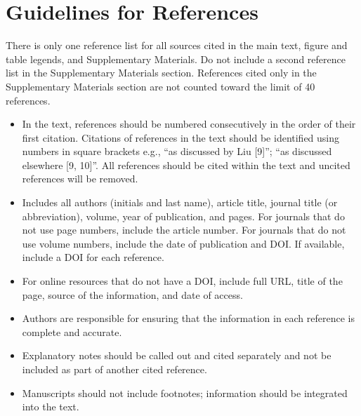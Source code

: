 \documentclass{article}
\begin{document}
\section*{Guidelines for References}
There is only one reference list for all sources cited in the main text, figure and table legends, and Supplementary Materials. Do not include a second reference list in the Supplementary Materials section. References cited only in the Supplementary Materials section are not counted toward the limit of 40 references.
\begin{itemize}
    \item In the text, references should be numbered consecutively in the order of their first citation. Citations of references in the text should be identified using numbers in square brackets e.g., “as discussed by Liu [9]”; “as discussed elsewhere [9, 10]”. All references should be cited within the text and uncited references will be removed.
    \item Includes all authors (initials and last name), article title, journal title (or abbreviation), volume, year of publication, and pages. For journals that do not use page numbers, include the article number. For journals that do not use volume numbers, include the date of publication and DOI. If available, include a DOI for each reference.
    \item For online resources that do not have a DOI, include full URL, title of the page, source of the information, and date of access.
    \item Authors are responsible for ensuring that the information in each reference is complete and accurate.
    \item Explanatory notes should be called out and cited separately and not be included as part of another cited reference. 
    \item Manuscripts should not include footnotes; information should be integrated into the text.  
\end{itemize}

\printbibliography
\end{document}
